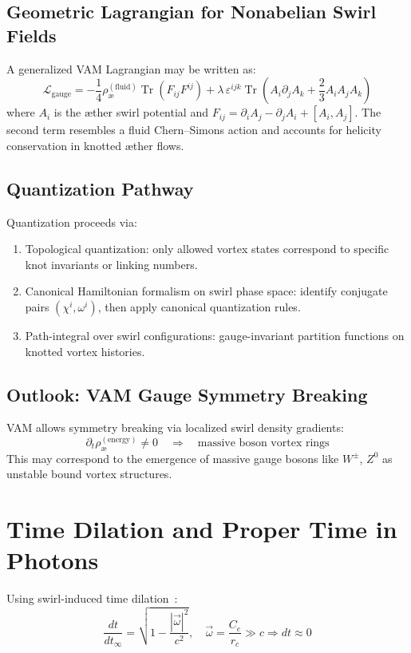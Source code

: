         \subsection{Geometric Lagrangian for Nonabelian Swirl Fields}

            A generalized VAM Lagrangian may be written as:
            \[
                \mathcal{L}_{\text{gauge}} = -\frac{1}{4} \rho_\text{\ae}^{(\text{fluid})} \operatorname{Tr}(F_{ij} F^{ij}) + \lambda \, \varepsilon^{ijk} \operatorname{Tr}\left(A_i \partial_j A_k + \frac{2}{3} A_i A_j A_k \right)
            \]
            where \( A_i \) is the æther swirl potential and \( F_{ij} = \partial_i A_j - \partial_j A_i + [A_i, A_j] \). The second term resembles a fluid Chern–Simons action and accounts for helicity conservation in knotted æther flows.

        \subsection{Quantization Pathway}

            Quantization proceeds via:
            \begin{enumerate}
                \item Topological quantization: only allowed vortex states correspond to specific knot invariants or linking numbers.
                \item Canonical Hamiltonian formalism on swirl phase space: identify conjugate pairs \( (\chi^i, \omega^i) \), then apply canonical quantization rules.
                \item Path-integral over swirl configurations: gauge-invariant partition functions on knotted vortex histories.
            \end{enumerate}

        \subsection{Outlook: VAM Gauge Symmetry Breaking}

        VAM allows symmetry breaking via localized swirl density gradients:
        \[
            \partial_t \rho_\text{\ae}^{(\text{energy})} \neq 0 \quad \Rightarrow \quad \text{massive boson vortex rings}
        \]
        This may correspond to the emergence of massive gauge bosons like \( W^\pm \), \( Z^0 \) as unstable bound vortex structures.



\section{Time Dilation and Proper Time in Photons}

    Using swirl-induced time dilation~\cite{VAM-1}:
    \begin{equation}
        \frac{dt}{dt_\infty} = \sqrt{1 - \frac{|\vec{\omega}|^2}{c^2}}, \quad \vec{\omega} = \frac{C_e}{r_c} \gg c \Rightarrow dt \approx 0
    \end{equation}